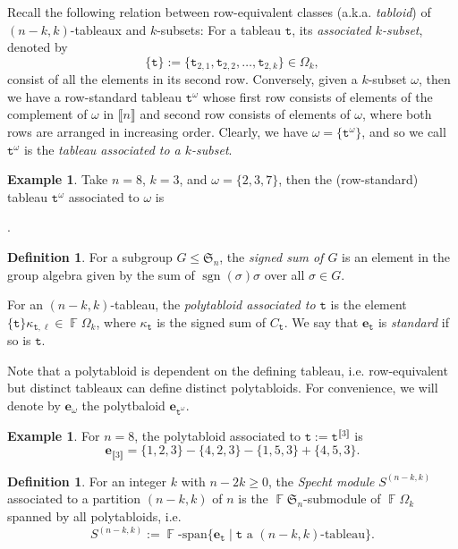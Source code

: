 \documentclass[a4paper]{amsart}
\numberwithin{equation}{subsection}
\newcommand\drawtbx[2]{%
	\begin{scope}[shift={#2}]
    \tableauRow=0
    \foreach \Row in {#1} {
       \tableauCol=1
       \foreach\k in \Row {
          \draw(\the\tableauCol,\the\tableauRow)+(-.5,-.5)rectangle++(.5,.5);
          \draw(\the\tableauCol,\the\tableauRow)node{\k};
          \global\advance\tableauCol by 1
       }
       \global\advance\tableauRow by -1
    }
	\end{scope}
}
\theoremstyle{definition}
\newtheorem{definition}[theorem]{Definition}
\newtheorem{example}[theorem]{Example}
\DeclareMathOperator{\F}{\mathbb{F}}
\newcommand{\interval}[1]{\llbracket #1 \rrbracket}
\DeclareMathOperator{\sgn}{\mathrm{sgn}}
\newcommand{\bfe}{\pmb{e}}
\newcommand{\tbx}{\mathtt{t}}
\numberwithin{equation}{subsection}
\begin{document}
Recall the following relation between row-equivalent classes (a.k.a. \emph{tabloid}) of $(n-k,k)$-tableaux and $k$-subsets:
For a tableau $\tbx$, its \emph{associated $k$-subset}, denoted by 
\[\{\tbx\}:=\{\tbx_{2,1}, \tbx_{2,2}, \ldots, \tbx_{2,k}\} \in \Omega_k,\]
consist of all the elements in its second row.
Conversely, given a $k$-subset $\omega$, then we have a row-standard tableau $\tbx^\omega$ whose first row consists of elements of the complement of $\omega$ in $\interval{n}$ and second row consists of elements of $\omega$, where both rows are arranged in increasing order.
Clearly, we have $\omega = \{\tbx^\omega\}$, and so we call $\tbx^\omega$ is the \emph{tableau associated to a $k$-subset}.

\begin{example}
Take $n=8$, $k=3$, and $\omega=\{2,3,7\}$, then the (row-standard) tableau $\tbx^\omega$ associated to $\omega$ is
\begin{center}.\end{center}
\end{example}

\begin{definition}\label{def:poly}
For a subgroup $G\leq \mathfrak{S}_n$, the \emph{signed sum of $G$} is an element in the group algebra given by the sum of $\sgn(\sigma)\sigma$ over all $\sigma\in G$.  

For an $(n-k,k)$-tableau, the \emph{polytabloid associated to $\tbx$} is the element $\{\tbx\}\kappa_{\tbx,\ell}\in \F\Omega_k$, where $\kappa_{\tbx}$ is the signed sum of $C_{\tbx}$.  We say that $\bfe_{\tbx}$ is \emph{standard} if so is $\tbx$.
\end{definition}

Note that a polytabloid is dependent on the defining tableau, i.e. row-equivalent but distinct tableaux can define distinct polytabloids.
For convenience, we will denote by $\bfe_{\omega}$ the polytbaloid $\bfe_{\tbx^{\omega}}$.

\begin{example}
For $n=8$, the polytabloid associated to $\tbx:= \tbx^{\interval{3}}$ is
\[
\bfe_{\interval{3}} = \{1,2,3\} - \{4,2,3\} - \{1,5,3\} +\{4,5,3\}.
\]
\end{example}

\medskip

\begin{definition}
For an integer $k$ with $n-2k\geq 0$, the \emph{Specht module} $S^{(n-k,k)}$ associated to a partition $(n-k,k)$ of $n$ is the $\F\mathfrak{S}_n$-submodule of $\F\Omega_k$ spanned by all polytabloids, i.e.
\[
S^{(n-k,k)} := \F\text{-span}\{ \bfe_{\tbx} \mid \tbx\text{ a $(n-k,k)$-tableau}\}.
\]
\end{definition}
\end{document}
